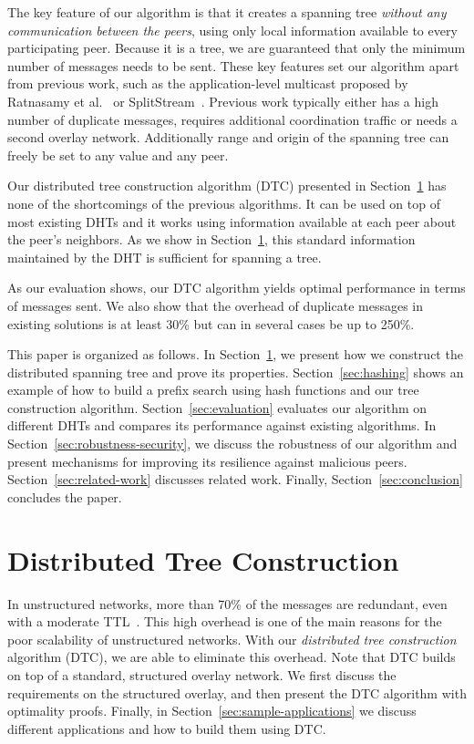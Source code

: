 \documentclass[fleqn,12pt,twoside]{article}
\begin{document}
The key feature of our algorithm is that it creates a spanning tree
\emph{without any communication between the peers}, using only local
information available to every participating peer. Because it
is a tree, we are guaranteed that only the minimum number of messages
needs to be sent. These key features set our algorithm apart from
previous work, such as the application-level multicast proposed by
Ratnasamy et al.~\cite{ratnasamy2001alm} or
SplitStream~\cite{CastroM:SplitStream}.  Previous work typically
either has a high number of duplicate messages, requires additional
coordination traffic or needs a second overlay network. Additionally range and 
origin of the spanning tree can freely be set to any value and any peer.

Our distributed tree construction algorithm (DTC) presented in
Section~\ref{sec:flooding_algorithm} has none of the shortcomings of
the previous algorithms. It can be used on top of most existing DHTs
and it works using information available at each peer about the peer's
neighbors. As we show in Section~\ref{sec:flooding_algorithm}, this
standard information maintained by the DHT is sufficient for spanning
a tree.

As our evaluation shows, our DTC algorithm yields optimal performance
in terms of messages sent. We also show that the overhead of duplicate
messages in existing solutions is at least 30\% but can in several
cases be up to 250\%.

This paper is organized as follows. In
Section~\ref{sec:flooding_algorithm}, we present how we construct the
distributed spanning tree and prove its properties.
Section~\ref{sec:hashing} shows an example of how to build a prefix
search using hash functions and our tree construction algorithm.
Section~\ref{sec:evaluation} evaluates our algorithm on different DHTs
and compares its performance against existing algorithms. In
Section~\ref{sec:robustness-security}, we discuss the robustness of
our algorithm and present mechanisms for improving its resilience
against malicious peers. Section~\ref{sec:related-work} discusses
related work. Finally, Section~\ref{sec:conclusion} concludes the
paper.


\section{Distributed Tree Construction}
\label{sec:flooding_algorithm}

In unstructured networks, more than 70\% of the messages are
redundant, even with a moderate TTL~\cite{jiang2003lef}.  This high
overhead is one of the main reasons for the poor scalability of
unstructured networks. With our \emph{distributed tree construction}
algorithm (DTC), we are able to eliminate this overhead. Note that DTC
builds on top of a standard, structured overlay network. We first
discuss the requirements on the structured overlay, and then
present the DTC algorithm with optimality proofs.  Finally, in
Section~\ref{sec:sample-applications} we discuss different
applications and how to build them using DTC.
\end{document}
